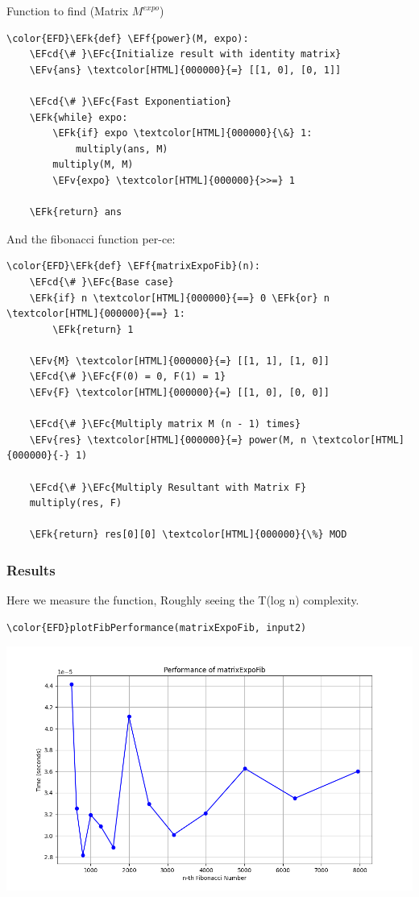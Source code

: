 \documentclass[a4paper,12pt]{article}
\newcommand{\EFc}[1]{\textcolor{EFc}{#1}} %
\newcommand{\EFcd}[1]{\textcolor{EFcd}{#1}} %
\newcommand{\EFk}[1]{\textcolor{EFk}{#1}} %
\newcommand{\EFf}[1]{\textcolor{EFf}{#1}} %
\newcommand{\EFv}[1]{\textcolor{EFv}{#1}} %
\begin{document}
Function to find (Matrix \(M ^{expo}\))
\begin{Code}
\begin{Verbatim}
\color{EFD}\EFk{def} \EFf{power}(M, expo):
    \EFcd{\# }\EFc{Initialize result with identity matrix}
    \EFv{ans} \textcolor[HTML]{000000}{=} [[1, 0], [0, 1]]

    \EFcd{\# }\EFc{Fast Exponentiation}
    \EFk{while} expo:
        \EFk{if} expo \textcolor[HTML]{000000}{\&} 1:
            multiply(ans, M)
        multiply(M, M)
        \EFv{expo} \textcolor[HTML]{000000}{>>=} 1

    \EFk{return} ans
\end{Verbatim}
\end{Code}

And the fibonacci function per-ce:
\begin{Code}
\begin{Verbatim}
\color{EFD}\EFk{def} \EFf{matrixExpoFib}(n):
    \EFcd{\# }\EFc{Base case}
    \EFk{if} n \textcolor[HTML]{000000}{==} 0 \EFk{or} n \textcolor[HTML]{000000}{==} 1:
        \EFk{return} 1

    \EFv{M} \textcolor[HTML]{000000}{=} [[1, 1], [1, 0]]
    \EFcd{\# }\EFc{F(0) = 0, F(1) = 1}
    \EFv{F} \textcolor[HTML]{000000}{=} [[1, 0], [0, 0]]

    \EFcd{\# }\EFc{Multiply matrix M (n - 1) times}
    \EFv{res} \textcolor[HTML]{000000}{=} power(M, n \textcolor[HTML]{000000}{-} 1)

    \EFcd{\# }\EFc{Multiply Resultant with Matrix F}
    multiply(res, F)

    \EFk{return} res[0][0] \textcolor[HTML]{000000}{\%} MOD
\end{Verbatim}
\end{Code}
\subsubsection{Results}
\label{sec:orge0c26b6}
Here we measure the function, Roughly seeing the T(log n) complexity.
\begin{Code}
\begin{Verbatim}
\color{EFD}plotFibPerformance(matrixExpoFib, input2)
\end{Verbatim}
\end{Code}

\begin{center}
\includegraphics[width=.9\linewidth]{matrixExpoFib.png}
\label{org403c6f1}
\end{center}
\end{document}
